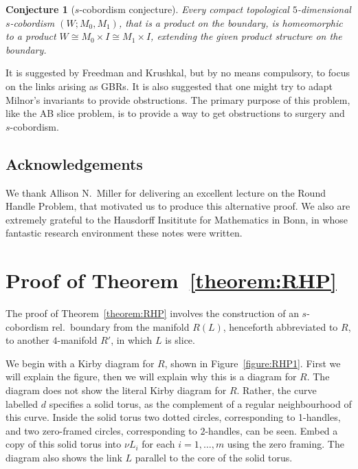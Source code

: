 \documentclass[11pt, oneside]{amsart}
\numberwithin{equation}{section}
\theoremstyle{plain}
\newtheorem{conjecture}[equation]{Conjecture}
\theoremstyle{definition}
\theoremstyle{remark}
\numberwithin{equation}{section}
\begin{document}
\begin{conjecture}[$s$-cobordism conjecture]
   Every compact topological $5$-dimensional $s$-cobordism $(W;M_0,M_1)$, that is a product on the boundary, is homeomorphic to a product $W \cong M_0 \times I \cong M_1 \times I$, extending the given product structure on the boundary.
\end{conjecture}

It is suggested by Freedman and Krushkal, but by no means compulsory, to focus on the links arising as GBRs.
It is also suggested that one might try to adapt Milnor's invariants to provide obstructions.
The primary purpose of this problem, like the AB slice problem, is to provide a way to get obstructions to surgery and $s$-cobordism.

\subsection*{Acknowledgements}

We thank Allison N.\ Miller for delivering an excellent lecture on the Round Handle Problem, that motivated us to produce this alternative proof.
We also are extremely grateful to the Hausdorff Insititute for Mathematics in Bonn, in whose fantastic research environment these notes were written.

\section{Proof of Theorem~\ref{theorem:RHP}}

The proof of Theorem~\ref{theorem:RHP} involves the construction of an $s$-cobordism rel.\ boundary from the manifold $R(L)$, henceforth abbreviated to $R$, to another $4$-manifold $R'$, in which $L$ is slice.

We begin with a Kirby diagram for $R$, shown in Figure~\ref{figure:RHP1}.
First we will explain the figure, then we will explain why this is a diagram for $R$.  The diagram does not show the literal Kirby diagram for $R$.  Rather, the curve labelled $d$ specifies a solid torus, as the complement of a regular neighbourhood of this curve.  Inside the solid torus two dotted circles, corresponding to 1-handles, and two zero-framed circles, corresponding to $2$-handles, can be seen.  Embed a copy of this solid torus into $\nu L_i$ for each $i=1,\dots,m$ using the zero framing.    The diagram also shows the link $L$ parallel to the core of the solid torus.
\end{document}
